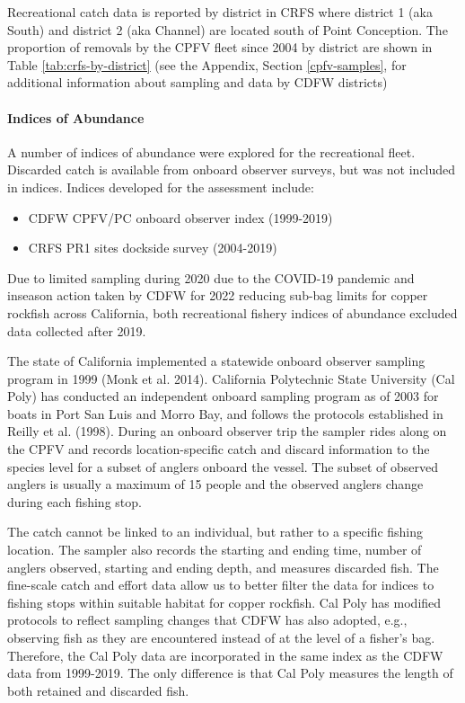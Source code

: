 \documentclass[11pt,
  english,
  letterpaper,
]{article}
\providecommand{\tightlist}{%
  \setlength{\itemsep}{0pt}\setlength{\parskip}{0pt}}
\providecommand{\tightlist}{%
  \setlength{\itemsep}{0pt}\setlength{\parskip}{0pt}}
\begin{document}
Recreational catch data is reported by district in CRFS where district 1 (aka South) and district 2 (aka Channel) are located south of Point Conception. The proportion of removals by the CPFV fleet since 2004 by district are shown in Table \ref{tab:crfs-by-district} (see the Appendix, Section \ref{cpfv-samples}, for additional information about sampling and data by CDFW districts)

\hypertarget{indices-of-abundance}{%
\paragraph{Indices of Abundance}\label{indices-of-abundance}}

\hfill\break

A number of indices of abundance were explored for the recreational fleet. Discarded catch is available from onboard observer surveys, but was not included in indices. Indices developed for the assessment include:

\begin{itemize}
\tightlist
\item
  CDFW CPFV/PC onboard observer index (1999-2019)
\item
  CRFS PR1 sites dockside survey (2004-2019)
\end{itemize}

Due to limited sampling during 2020 due to the COVID-19 pandemic and inseason action taken by CDFW for 2022 reducing sub-bag limits for copper rockfish across California, both recreational fishery indices of abundance excluded data collected after 2019.

The state of California implemented a statewide onboard observer sampling program in 1999 (Monk et al. 2014). California Polytechnic State University (Cal Poly) has conducted an independent onboard sampling program as of 2003 for boats in Port San Luis and Morro Bay, and follows the protocols established in Reilly et al. (1998). During an onboard observer trip the sampler rides along on the CPFV and records location-specific catch and discard information to the species level for a subset of anglers onboard the vessel. The subset of observed anglers is usually a maximum of 15 people and the observed anglers change during each fishing stop.

The catch cannot be linked to an individual, but rather to a specific fishing location. The sampler also records the starting and ending time, number of anglers observed, starting and ending depth, and measures discarded fish. The fine-scale catch and effort data allow us to better filter the data for indices to fishing stops within suitable habitat for copper rockfish. Cal Poly has modified protocols to reflect sampling changes that CDFW has also adopted, e.g., observing fish as they are encountered instead of at the level of a fisher's bag. Therefore, the Cal Poly data are incorporated in the same index as the CDFW data from 1999-2019. The only difference is that Cal Poly measures the length of both retained and discarded fish.
\end{document}
